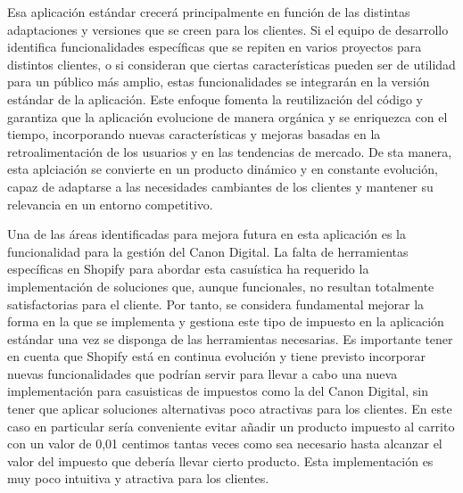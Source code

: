 \documentclass[12pt]{article}
\begin{document}
Esa aplicación estándar crecerá principalmente en función de las distintas adaptaciones y versiones que se creen para los clientes. Si el equipo de desarrollo identifica funcionalidades
específicas que se repiten en varios proyectos para distintos clientes, o si consideran que ciertas características pueden ser de utilidad para un público más amplio, estas
funcionalidades se integrarán en la versión estándar de la aplicación. Este enfoque fomenta la reutilización del código y garantiza que la aplicación evolucione de manera
orgánica y se enriquezca con el tiempo, incorporando nuevas características y mejoras basadas en la retroalimentación de los usuarios y en las tendencias de mercado.
De sta manera, esta aplciación se convierte en un producto dinámico y en constante evolución, capaz de adaptarse a las necesidades cambiantes de los clientes y mantener 
su relevancia en un entorno competitivo.

Una de las áreas identificadas para mejora futura en esta aplicación es la funcionalidad para la gestión del Canon Digital. La falta de herramientas específicas en Shopify
para abordar esta casuística ha requerido la implementación de soluciones que, aunque funcionales, no resultan totalmente satisfactorias para el cliente.
Por tanto, se considera fundamental mejorar la forma en la que se implementa y gestiona este tipo de impuesto en la aplicación estándar una vez se disponga
de las herramientas necesarias. Es importante tener en cuenta que Shopify está en continua evolución y tiene previsto incorporar nuevas funcionalidades que podrían servir
para llevar a cabo una nueva implementación para casuisticas de impuestos como la del Canon Digital, sin tener que aplicar soluciones alternativas poco atractivas para los clientes. En este caso en particular
sería conveniente evitar añadir un producto impuesto al carrito con un valor de 0,01 centimos tantas veces como sea necesario hasta alcanzar el valor del impuesto que debería llevar cierto producto. Esta implementación
es muy poco intuitiva y atractiva para los clientes.

\clearpage
\end{document}
